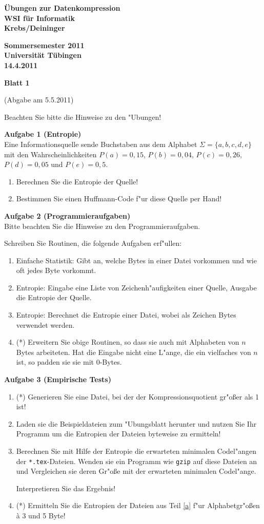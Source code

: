 \documentclass[a4paper]{article}
\def\header#1#2#3#4{\pagestyle{empty}
\noindent
\begin{minipage}[t]{0.6\textwidth}
\begin{flushleft}
\bf \"Ubungen zur Datenkompression\\
WSI f\"ur Informatik\\
Krebs/Deininger
\end{flushleft}
\end{minipage}
\begin{minipage}[t]{0.4\textwidth}
\begin{flushright}
\bf Sommersemester 2011\\
Universit\"at T\"ubingen\\
#2 %
\end{flushright}
\end{minipage}

\begin{center}
{\Large\bf Blatt #1}

{(Abgabe am #3)}
\end{center}
}
\begin{document}
\header{1}{14.4.2011}{5.5.2011}{}

Beachten Sie bitte die Hinweise zu den "Ubungen!

\bigskip

{\bf Aufgabe 1  \quad(Entropie)}\\
Eine Informationsquelle sende Buchstaben aus dem Alphabet $\Sigma=\{a,b,c,d,e\}$ mit den Wahrscheinlichkeiten $P(a)=0,15$, $P(b)=0,04$, $P(c)=0,26$, $P(d)=0,05$ und $P(e)=0,5$.
\begin{enumerate}
\item Berechnen Sie die Entropie der Quelle!
\item Bestimmen Sie einen Huffmann-Code f"ur diese Quelle per Hand!
\end{enumerate}

\bigskip

{\bf Aufgabe 2  \quad(Programmieraufgaben)}\\
Bitte beachten Sie die Hinweise zu den Programmieraufgaben.

\smallskip
Schreiben Sie Routinen, die folgende Aufgaben erf"ullen:
\begin{enumerate}
\item Einfache Statistik: Gibt an, welche Bytes in einer Datei vorkommen und wie oft jedes Byte vorkommt.
\item Entropie: Eingabe eine Liste von Zeichenh"aufigkeiten einer Quelle, Ausgabe die Entropie der Quelle.
\item Entropie: Berechnet die Entropie einer Datei, wobei als Zeichen Bytes verwendet werden.
\item(*) Erweitern Sie obige Routinen, so dass sie auch mit Alphabeten von $n$ Bytes arbeiteten. Hat die Eingabe nicht eine L"ange, die ein vielfaches von $n$ ist, so padden sie sie mit 0-Bytes.
\end{enumerate}

\bigskip

{\bf Aufgabe 3  \quad(Empirische Tests)}\\
\begin{enumerate}
\item(*) Generieren Sie eine Datei, bei der der Kompressionsquotient gr"o{\ss}er als 1 ist!
\item\label{a} Laden sie die Beispieldateien zum "Ubungsblatt herunter und nutzen Sie Ihr Programm um die Entropien der Dateien byteweise zu ermitteln!
\item Berechnen Sie mit Hilfe der Entropie die erwarteten minimalen Codel"angen der \verb$*.tex$-Dateien. Wenden sie ein Programm wie \verb$gzip$ auf diese Dateien an und Vergleichen sie deren Gr"o{\ss}e mit der erwarteten minimalen Codel"ange.

Interpretieren Sie das Ergebnis!
\item(*) Ermitteln Sie die Entropien der Dateien aus Teil \ref{a} f"ur Alphabetgr"o{\ss}en \`a 3 und 5 Byte!
\end{enumerate}
\end{document}
